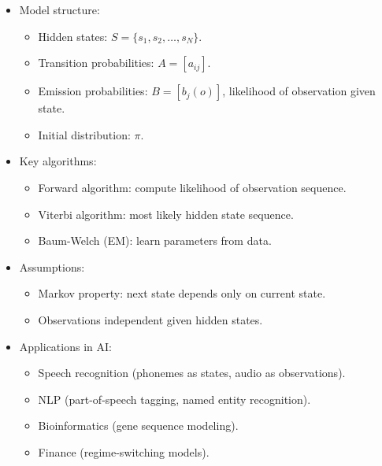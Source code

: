 \documentclass[
  letterpaper,
  DIV=11,
  numbers=noendperiod]{scrreprt}
\providecommand{\tightlist}{%
  \setlength{\itemsep}{0pt}\setlength{\parskip}{0pt}}
\begin{document}
\begin{itemize}
\item
  Model structure:

  \begin{itemize}
  \tightlist
  \item
    Hidden states: \(S = \{s_1, s_2, \dots, s_N\}\).
  \item
    Transition probabilities: \(A = [a_{ij}]\).
  \item
    Emission probabilities: \(B = [b_j(o)]\), likelihood of observation
    given state.
  \item
    Initial distribution: \(\pi\).
  \end{itemize}
\item
  Key algorithms:

  \begin{itemize}
  \tightlist
  \item
    Forward algorithm: compute likelihood of observation sequence.
  \item
    Viterbi algorithm: most likely hidden state sequence.
  \item
    Baum-Welch (EM): learn parameters from data.
  \end{itemize}
\item
  Assumptions:

  \begin{itemize}
  \tightlist
  \item
    Markov property: next state depends only on current state.
  \item
    Observations independent given hidden states.
  \end{itemize}
\item
  Applications in AI:

  \begin{itemize}
  \tightlist
  \item
    Speech recognition (phonemes as states, audio as observations).
  \item
    NLP (part-of-speech tagging, named entity recognition).
  \item
    Bioinformatics (gene sequence modeling).
  \item
    Finance (regime-switching models).
  \end{itemize}
\end{itemize}
\end{document}
